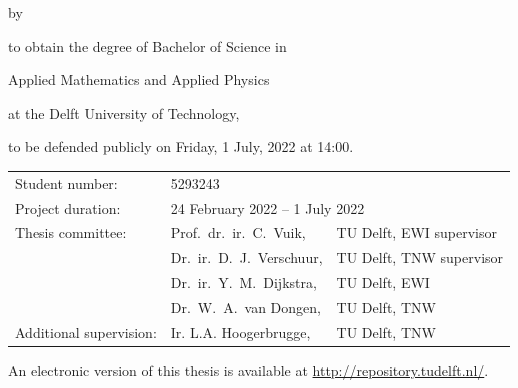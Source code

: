 \begin{titlepage}


\begin{center}


{\makeatletter
\fontsize{40}{40}\selectfont\@title
\makeatother}

{\makeatletter
\ifx\@subtitle\undefined\else
    \bigskip
   {\tudsffamily\fontsize{22}{32}\selectfont\@subtitle}
\fi
\makeatother}

\bigskip
\bigskip

by

\bigskip
\bigskip

{\makeatletter
\fontsize{30}{30}\selectfont\@author
\makeatother}

\bigskip
\bigskip

to obtain the degree of Bachelor of Science in

Applied Mathematics and Applied Physics

at the Delft University of Technology,

to be defended publicly on Friday, 1 July, 2022 at 14:00.

\vfill

\begin{tabular}{lll}
    Student number: & 5293243 \\
    Project duration: & \multicolumn{2}{l}{24 February 2022 -- 1 July 2022} \\
    Thesis committee: & Prof.\ dr.\ ir.\ C.\ Vuik, & TU Delft, EWI supervisor \\
        & Dr.\ ir.\ D.\ J.\ Verschuur, & TU Delft, TNW supervisor \\
        & Dr.\ ir.\ Y.\ M.\ Dijkstra, & TU Delft, EWI \\
        & Dr.\ W.\ A.\ van Dongen, & TU Delft, TNW \\
    Additional supervision: & Ir. L.A. Hoogerbrugge, & TU Delft, TNW \\
\end{tabular}

\bigskip
\bigskip
\bigskip
\bigskip
An electronic version of this thesis is available at \url{http://repository.tudelft.nl/}.


\end{center}
\end{titlepage}
